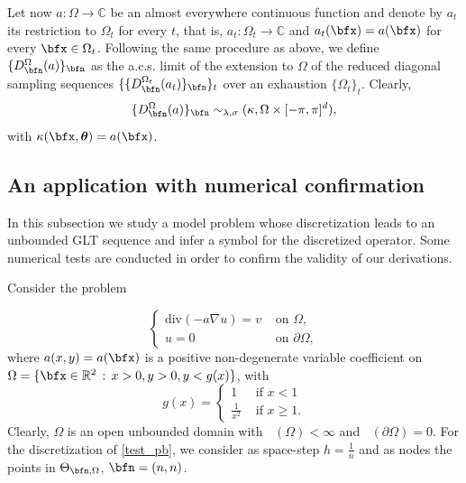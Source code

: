 \documentclass{amsart}
\DeclareMathOperator{\Ld}{\mathcal{L}^d}
\newcommand{\bftheta}{{\boldsymbol\theta}}
\begin{document}
Let now $a:\Omega \to \mathbb{C}$ be an almost everywhere continuous function and denote by $a_t$ its restriction to $\Omega_t$ for every $t$, that is, $a_t : \Omega_t \to \mathbb{C}$ and $a_t(\bfx)=a(\bfx)$ for every $\bfx \in \Omega_t$.
Following the same procedure as above, we define $\{D_{\bfn}^{\Omega}(a)\}_{\bfn}$ as the a.c.s. limit of the extension to $\Omega$ of the reduced diagonal sampling sequences $\{\{D_{\bfn}^{\Omega_t}(a_t)\}_{\bfn}\}_t$ over an exhaustion $\{\Omega_t\}_t$. Clearly,
\begin{equation*}
    \{D_{\bfn}^{\Omega}(a)\}_{\bfn} \sim_{\lambda,\sigma} (\kappa, \Omega \times [-\pi,\pi]^d),
\end{equation*}
with $\kappa(\bfx,\bftheta)=a(\bfx)$.

\subsection{An application with numerical confirmation}

In this subsection we study a model problem whose discretization leads to an unbounded GLT sequence and infer a symbol for the discretized operator. Some numerical tests are conducted in order to confirm the validity of our derivations.

Consider the problem

\begin{equation}\label{test_pb}
    \begin{cases}
        \text{div}(-a\nabla u)=v & \text{ on } \Omega,\\
        u=0 & \text{ on } \partial \Omega,
    \end{cases}
\end{equation}
where $a(x,y)=a(\bfx)$ is a positive non-degenerate variable coefficient on $\Omega = \{ \bfx \in \mathbb{R}^2 \, : \, x>0, y>0, y < g(x)\}$, with
\begin{equation*}
    g(x)=\begin{cases}
        1 & \text{ if } x<1 \\
        \frac{1}{x^2} & \text{ if } x \geq 1.
    \end{cases}
\end{equation*}
Clearly, $\Omega$ is an open unbounded domain with $\Ld(\Omega) < \infty$ and $\Ld(\partial \Omega) =0$. For the discretization of \eqref{test_pb}, we consider as space-step $h=\frac{1}{n}$ and as nodes the points in $\Theta_{\bfn,\Omega} $, $\bfn=(n,n)$.
\end{document}

